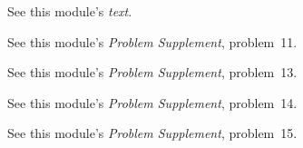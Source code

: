 {\BriefAns

\begin{one-digit-list}
\item [1.] See this module's \textit{text}.

\item [2.] See this module's \textit{Problem Supplement}, problem~11.

\item [3.] See this module's \textit{Problem Supplement}, problem~13.

\item [4.] See this module's \textit{Problem Supplement}, problem~14.

\item [5.] See this module's \textit{Problem Supplement}, problem~15.
\end{one-digit-list}
}%
